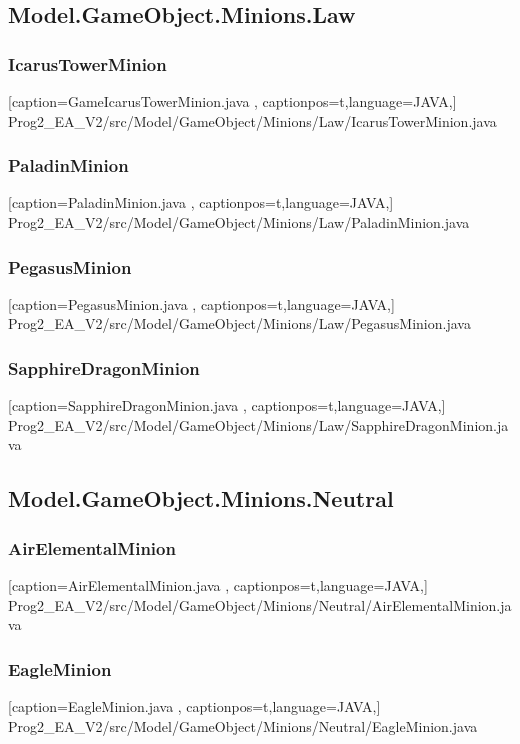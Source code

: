 \documentclass[a4paper,12pt]{scrartcl}
\begin{document}
	\subsection{Model.GameObject.Minions.Law}
	\subsubsection{IcarusTowerMinion}
	
	[caption={GameIcarusTowerMinion.java}
	\label{lst:javaclass},
	captionpos=t,language=JAVA,]
	{Prog2_EA_V2/src/Model/GameObject/Minions/Law/IcarusTowerMinion.java}
	\subsubsection{PaladinMinion}
	
	[caption={PaladinMinion.java}
	\label{lst:javaclass},
	captionpos=t,language=JAVA,]
	{Prog2_EA_V2/src/Model/GameObject/Minions/Law/PaladinMinion.java}
	\subsubsection{PegasusMinion}
	
	[caption={PegasusMinion.java}
	\label{lst:javaclass},
	captionpos=t,language=JAVA,]
	{Prog2_EA_V2/src/Model/GameObject/Minions/Law/PegasusMinion.java}
	\subsubsection{SapphireDragonMinion}
	
	[caption={SapphireDragonMinion.java}
	\label{lst:javaclass},
	captionpos=t,language=JAVA,]
	{Prog2_EA_V2/src/Model/GameObject/Minions/Law/SapphireDragonMinion.java}
	\subsection{Model.GameObject.Minions.Neutral}
	\subsubsection{AirElementalMinion}
	
	[caption={AirElementalMinion.java}
	\label{lst:javaclass},
	captionpos=t,language=JAVA,]
	{Prog2_EA_V2/src/Model/GameObject/Minions/Neutral/AirElementalMinion.java}
	\subsubsection{EagleMinion}
	
	[caption={EagleMinion.java}
	\label{lst:javaclass},
	captionpos=t,language=JAVA,]
	{Prog2_EA_V2/src/Model/GameObject/Minions/Neutral/EagleMinion.java}
\end{document}
